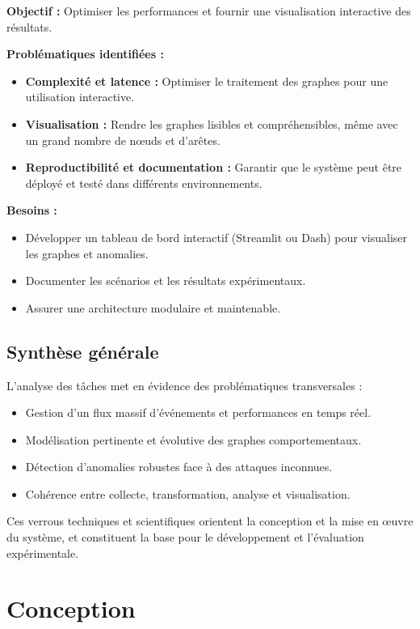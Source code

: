 \documentclass[a4paper,12pt]{article}
\begin{document}
\textbf{Objectif :} Optimiser les performances et fournir une visualisation interactive des résultats.

\textbf{Problématiques identifiées :}
\begin{itemize}
    \item \textbf{Complexité et latence :} Optimiser le traitement des graphes pour une utilisation interactive.
    \item \textbf{Visualisation :} Rendre les graphes lisibles et compréhensibles, même avec un grand nombre de nœuds et d’arêtes.
    \item \textbf{Reproductibilité et documentation :} Garantir que le système peut être déployé et testé dans différents environnements.
\end{itemize}

\textbf{Besoins :} 
\begin{itemize}
    \item Développer un tableau de bord interactif (Streamlit ou Dash) pour visualiser les graphes et anomalies.
    \item Documenter les scénarios et les résultats expérimentaux.
    \item Assurer une architecture modulaire et maintenable.
\end{itemize}

\subsection{Synthèse générale}

L’analyse des tâches met en évidence des problématiques transversales :

\begin{itemize}
    \item Gestion d’un flux massif d’événements et performances en temps réel.
    \item Modélisation pertinente et évolutive des graphes comportementaux.
    \item Détection d’anomalies robustes face à des attaques inconnues.
    \item Cohérence entre collecte, transformation, analyse et visualisation.
\end{itemize}

Ces verrous techniques et scientifiques orientent la conception et la mise en œuvre du système, et constituent la base pour le développement et l’évaluation expérimentale.


\section{Conception}
\end{document}
